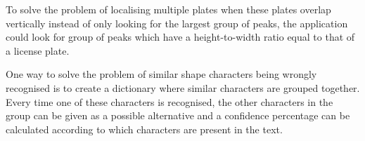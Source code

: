 
To solve the problem of localising multiple plates when these plates overlap vertically instead of only looking for the largest group of peaks, the application could look for group of peaks which have a height-to-width ratio equal to that of a license plate. 


One way to solve the problem of similar shape characters being wrongly recognised is to create a dictionary where similar characters are grouped together. Every time one of these characters is recognised, the other characters in the group can be given as a possible alternative and a confidence percentage can be calculated according to which characters are present in the text.



